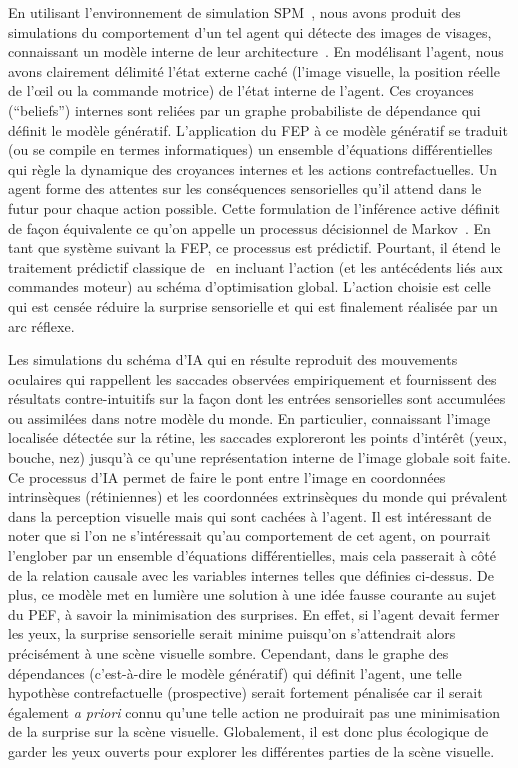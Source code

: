 En utilisant l'environnement de simulation SPM~\citep{SPM12}, nous avons produit des simulations du comportement d'un tel agent qui détecte
des images de visages, connaissant un modèle interne de leur architecture~\citep{Friston12}. En modélisant l'agent, nous avons clairement  délimité l'état externe caché (l'image visuelle, la position réelle de l'œil ou la
commande motrice) de l'état interne de l'agent. Ces croyances (``beliefs'') internes
sont reliées par un graphe probabiliste de dépendance qui définit le
modèle génératif. L'application du FEP à ce modèle génératif se traduit
(ou se compile en termes informatiques) un ensemble d'équations
différentielles qui règle la dynamique des croyances internes
et les actions contrefactuelles. Un agent forme des attentes sur les
conséquences sensorielles qu'il attend dans le futur pour chaque action
possible. Cette formulation de l'inférence active définit de façon équivalente ce qu'on appelle
un processus décisionnel de Markov~\citep{Mirza18}. En tant que système
suivant la FEP, ce processus est prédictif. Pourtant, il étend le
traitement prédictif classique de~\citet{Rao99}
en incluant l'action (et les antécédents liés aux commandes moteur) au
schéma d'optimisation global. L'action choisie est celle qui est censée
réduire la surprise sensorielle et qui est finalement réalisée par un
arc réflexe.

Les simulations du schéma d'IA qui en résulte reproduit des
mouvements oculaires qui rappellent les saccades observées
empiriquement et fournissent des résultats contre-intuitifs sur la
façon dont les entrées sensorielles sont accumulées ou assimilées dans
notre modèle du monde. En particulier, connaissant l'image localisée
détectée sur la rétine, les saccades exploreront les points d'intérêt
(yeux, bouche, nez) jusqu'à ce qu'une représentation interne de l'image
globale soit faite. Ce processus d'IA permet de faire le pont entre
l'image en coordonnées intrinsèques (rétiniennes) et les coordonnées
extrinsèques du monde qui prévalent dans la perception visuelle mais qui
sont cachées à l'agent. Il est intéressant de noter que si l'on ne
s'intéressait qu'au comportement de cet agent, on pourrait l'englober
par un ensemble d'équations différentielles, mais cela passerait à côté
de la relation causale avec les variables internes telles que définies
ci-dessus. De plus, ce modèle met en lumière une solution à une idée
fausse courante au sujet du PEF, à savoir la minimisation des
surprises. En effet, si l'agent devait fermer les yeux, la surprise
sensorielle serait minime puisqu'on s'attendrait alors précisément à une
scène visuelle sombre. Cependant, dans le graphe des dépendances
(c'est-à-dire le modèle génératif) qui définit l'agent, une telle
hypothèse contrefactuelle (prospective) serait fortement pénalisée car
il serait également \emph{a priori} connu qu'une telle action ne produirait pas
une minimisation de la surprise sur la scène visuelle. Globalement, il
est donc plus écologique de garder les yeux ouverts pour explorer les
différentes parties de la scène visuelle.

